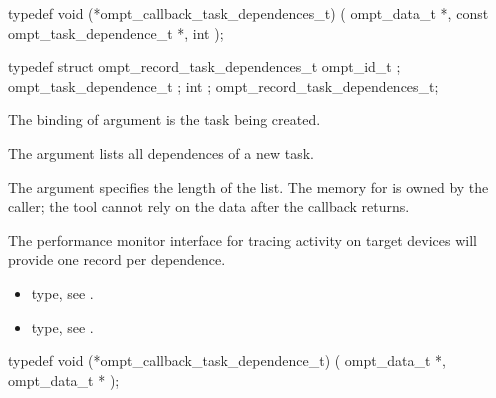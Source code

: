 \label{sec:ompt_callback_task_dependences_t}
\format

\begin{ccppspecific}
\begin{omptCallback}
typedef void (*ompt_callback_task_dependences_t) (
  ompt_data_t *,
  const ompt_task_dependence_t *,
  int 
);
\end{omptCallback}
\end{ccppspecific}


\record

\begin{ccppspecific}
\begin{omptRecord}
typedef struct ompt_record_task_dependences_t {
  ompt_id_t ;
  ompt_task_dependence_t ;
  int ;
} ompt_record_task_dependences_t;
\end{omptRecord}
\end{ccppspecific}



\argdesc

The binding of argument  is the task being created.

The argument  lists all dependences of a new task.

The argument  specifies the length of the list.
The memory for  is owned by the caller; the tool cannot rely on
the data after the callback returns.

The performance monitor interface for tracing activity on target devices will provide one record per dependence.

\crossreferences
\begin{itemize}
\item {} type, see
.
\item {} type, see
.
\end{itemize}



\label{sec:ompt_callback_task_dependence_t}
\format

\begin{ccppspecific}
\begin{omptCallback}
typedef void (*ompt_callback_task_dependence_t) (
  ompt_data_t *,
  ompt_data_t *
);
\end{omptCallback}
\end{ccppspecific}


